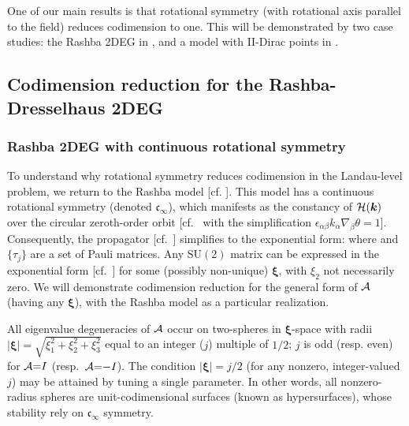 \documentclass[aps, showpacs, twocolumn, notitlepage, superscriptaddress]{revtex4-1}
\begin{document}
 
One of our main results is that   rotational symmetry (with rotational axis parallel to the field) reduces  codimension to one. This will be demonstrated by two  case studies: the Rashba 2DEG in , and a model with II-Dirac points in . 

\subsection{Codimension reduction for the Rashba-Dresselhaus 2DEG}\label{sec:singleparameterrashba}

\subsubsection{Rashba 2DEG with continuous rotational symmetry}\label{sec:ctsrot}

To understand why rotational symmetry reduces codimension in the Landau-level problem, we return to the Rashba model [cf. ]. This model has a continuous rotational symmetry (denoted $\mathfrak{c}_{\infty}$), which manifests as the constancy of ${\cal H}(\boldsymbol{k})$ over the circular zeroth-order orbit [cf.\  with the simplification $\epsilon_{\alpha\beta} k_{\alpha}\nabla_{\beta}\theta=1$]. Consequently, the propagator [cf.\ ] simplifies to the exponential form:
where
and $\{\tau_j\}$ are a set of Pauli matrices. Any $\text{SU}(2)$ matrix can be expressed in the exponential form [cf.\ ] for some (possibly non-unique) $\boldsymbol{\xi}$, with $\xi_2$ not necessarily zero. We will demonstrate codimension reduction for the general form of ${\cal A}$ (having any $\boldsymbol{\xi}$), with the Rashba model as a particular realization.

All eigenvalue degeneracies of ${\cal A}$ occur on two-spheres in $\boldsymbol{\xi}$-space with radii $|\boldsymbol{\xi}|{=}\sqrt{\xi_1^2{+}\xi_2^2{+}\xi_3^2}$ equal to an integer ($j$)  multiple of $1/2$;  ${j}$ is odd (resp. even) for  ${\cal A}{=}I$ (resp.\ ${\cal A}{=}{-}I$).  The condition $|\boldsymbol{\xi}|{=}j/2$ (for any nonzero, integer-valued $j$) may be attained by tuning a single parameter. In other words, all nonzero-radius spheres are unit-codimensional surfaces (known as hypersurfaces), whose stability rely on $\mathfrak{c}_{\infty}$ symmetry. 
\end{document}
